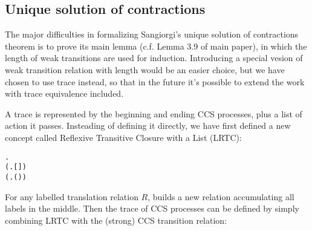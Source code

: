 \subsection{Unique solution of contractions}

The major difficulties in formalizing Sangiorgi's unique solution of
contractions theorem is to prove its main lemma (c.f. Lemma 3.9 of
main paper), in which the length of weak transitions are used for
induction. Introducing a special vesion of weak transition relation
with length would be an easier choice, but we have chosen to use trace
instead, so that in the future it's possible to extend the work with
trace equivalence included.

A trace is represented by the beginning and ending CCS processes, plus
a list of action it passes. Insteading of defining it directly, we
have first defined a new concept called Reflexive Transitive Closure with a
List (LRTC):
\begin{alltt}
\HOLTokenTurnstile{}      \HOLSymConst{\HOLTokenEquiv{}}
   \HOLSymConst{\HOLTokenForall{}}.
       (\HOLSymConst{\HOLTokenForall{}}.   [] ) \HOLSymConst{\HOLTokenConj{}}
       (\HOLSymConst{\HOLTokenForall{}}    .     \HOLSymConst{\HOLTokenConj{}}     \HOLSymConst{\HOLTokenImp{}}   (\HOLSymConst{::}) ) \HOLSymConst{\HOLTokenImp{}}
          
\end{alltt}
For any labelled translation relation $R$,  builds a new
relation accumulating all labels in the middle. Then the trace of CCS processes can be
defined by simply combining LRTC with the (strong) CCS transition
relation:
\begin{alltt}
 \HOLSymConst{=}  
\end{alltt}

